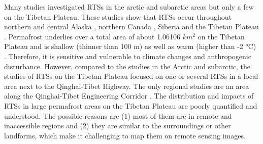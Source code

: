 \documentclass[preprint,12pt,authoryear]{elsarticle}
\begin{document}
Many studies investigated RTSs in the arctic and subarctic areas but only a few on the Tibetan Plateau. These studies show that RTSs occur throughout northern and central Alaska \citep{swanson2018growth,gooseff2009effects,balser2014timing}, northern Canada \citep{burn1989geomorphology, lacelle2010climatic, ramage_terrain_2017, lantuit_fifty_2008, lacelle_distribution_2015, segal2016acceleration, brooker2014investigating, kokelj2017climate, obu2017coastal, ramage_increasing_2018, lantz2008increasing, brooker2014mapping, frappier2017retrogressive, zwieback2018sub, rudy2017terrain, armstrong2018thaw, kokelj2013thawing, rudy2016transferability, burn1990canadian,  cassidy2017impacts}, Siberia \citep{czudek_thermokarst_1970, zwieback2018sub, leibman2003dynamics} and the Tibetan Plateau \citep{wang1995situ, niu2005engineering, niu2012development, niu2014thaw, niu2016thaw, sun2017creep, ma2006slope}. Permafrost underlies over a total area of about 1.06106 $km^2$ on the Tibetan Plateau \citep{zou2017new} and is shallow (thinner than 100 m) as well as warm (higher than -2 °C) \citep{zhou_geocryology_2000}. Therefore, it is sensitive and vulnerable to climate changes and anthropogenic disturbance. However, compared to the studies in the Arctic and subarctic, the studies of RTSs on the Tibetan Plateau focused on one or several RTSs in a local area next to the Qinghai-Tibet Highway. The only regional studies are an area along the Qinghai-Tibet Engineering Corridor \citep{niu2014thaw, niu2016thaw}. The distribution and impacts of RTSs in large permafrost areas on the Tibetan Plateau are poorly quantified and understood. The possible reasons are (1) most of them are in remote and inaccessible regions and (2) they are similar to the surroundings or other landforms, which make it challenging to map them on remote sensing images. 
\end{document}
